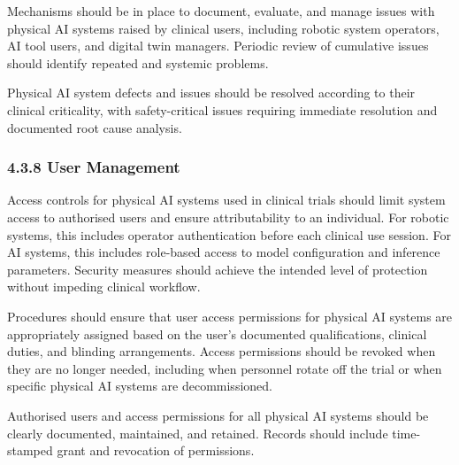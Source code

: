 \documentclass[11pt]{article}
\begin{document}
\begin{description}[leftmargin=2.5cm,style=sameline]

\item[(a)] Mechanisms should be in place to document, evaluate, and manage issues with physical AI systems raised by clinical users, including robotic system operators, AI tool users, and digital twin managers. Periodic review of cumulative issues should identify repeated and systemic problems.

\item[(b)] Physical AI system defects and issues should be resolved according to their clinical criticality, with safety-critical issues requiring immediate resolution and documented root cause analysis.

\end{description}

\subsubsection{4.3.8 User Management}

\begin{description}[leftmargin=2.5cm,style=sameline]

\item[(a)] Access controls for physical AI systems used in clinical trials should limit system access to authorised users and ensure attributability to an individual. For robotic systems, this includes operator authentication before each clinical use session. For AI systems, this includes role-based access to model configuration and inference parameters. Security measures should achieve the intended level of protection without impeding clinical workflow.

\item[(b)] Procedures should ensure that user access permissions for physical AI systems are appropriately assigned based on the user's documented qualifications, clinical duties, and blinding arrangements. Access permissions should be revoked when they are no longer needed, including when personnel rotate off the trial or when specific physical AI systems are decommissioned.

\item[(c)] Authorised users and access permissions for all physical AI systems should be clearly documented, maintained, and retained. Records should include time-stamped grant and revocation of permissions.

\end{description}
\end{document}
